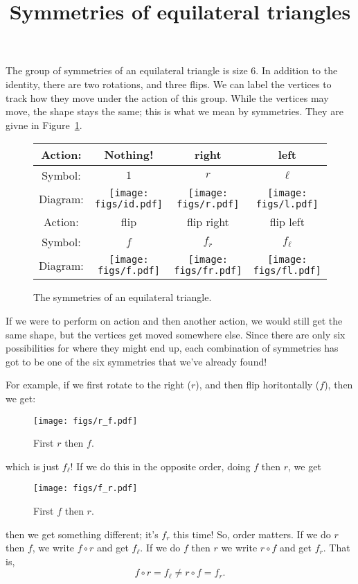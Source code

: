 \documentclass[12pt]{article}
\title{Symmetries of equilateral triangles}
\begin{document}
\thispagestyle{empty}

\maketitle

The group of symmetries of an equilateral triangle is size 6.  In
addition to the identity, there are two rotations, and three flips.
We can label the vertices to track how they move under the action of
this group.  While the vertices may move, the shape stays the same; this
is what we mean by symmetries.  They are givne in Figure~\ref{trisym}.
\begin{figure}[h]
   \centering
   \begin{tabular}{|c|c|c|c|}
     \hline Action: & Nothing! & right & left  \\
     \hline
     Symbol: & $1$ & $r$ & $\ell$  \\
     \hline
     Diagram: &
     \texttt{[image: figs/id.pdf]} &
     \texttt{[image: figs/r.pdf]}  &
     \texttt{[image: figs/l.pdf]} \\
     \hline
     \hline Action: & flip & flip right & flip left \\
     \hline
     Symbol: & $f$ & $f_r$ & $f_\ell$ \\
     \hline
     Diagram: &
     \texttt{[image: figs/f.pdf]}  &
     \texttt{[image: figs/fr.pdf]} &
     \texttt{[image: figs/fl.pdf]}\\
     \hline
   \end{tabular}
   \caption{The symmetries of an equilateral triangle.}
  \label{trisym}
\end{figure}

If we were to perform on action and then another action, we would
still get the same shape, but the vertices get moved somewhere else.
Since there are only six possibilities for where they might end up,
each combination of symmetries has got to be one of the six symmetries
that we've already found!

For example, if we first rotate to the right ($r$), and then flip
horitontally ($f$), then we get:
\begin{figure}[h]
  \centering
  \texttt{[image: figs/r\_f.pdf]}
  \caption{First $r$ then $f$.}
\end{figure}
which is just $f_\ell$!  If we do this in the opposite order, doing $f$
then $r$, we get
\begin{figure}[h]
  \centering
  \texttt{[image: figs/f\_r.pdf]}
  \caption{First $f$ then $r$.}
\end{figure}
then we get something different; it's $f_r$ this time!  So, order
matters.  If we do $r$ then $f$, we write $f\circ{}r$ and get
$f_\ell$.  If we do $f$ then $r$ we write $r\circ{}f$ and get $f_r$.
That is,
\begin{equation}
  \label{frrf}
  f \circ r = f_\ell \neq r \circ f = f_r.
\end{equation}
\end{document}
